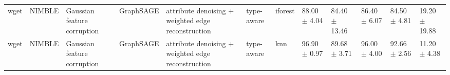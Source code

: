 \begin{tabular}{llllllllllll}
wget & NIMBLE & Gaussian feature corruption & GraphSAGE & attribute denoising + weighted edge reconstruction & type-aware & iforest & 88.00 $\pm$ 4.04 & 84.40 $\pm$ 13.46 & 86.40 $\pm$ 6.07 & 84.50 $\pm$ 4.81 & 19.20 $\pm$ 19.88 \\
wget & NIMBLE & Gaussian feature corruption & GraphSAGE & attribute denoising + weighted edge reconstruction & type-aware & knn & 96.90 $\pm$ 0.97 & 89.68 $\pm$ 3.71 & 96.00 $\pm$ 4.00 & 92.66 $\pm$ 2.56 & 11.20 $\pm$ 4.38 \\
\bottomrule
\end{tabular}
